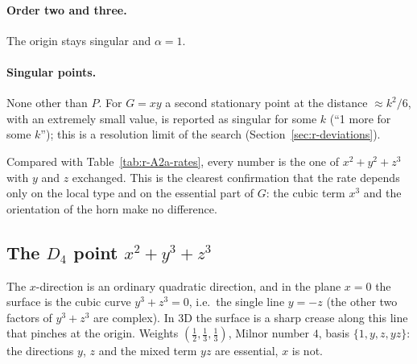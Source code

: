 \documentclass[12pt, a4paper]{article}
\theoremstyle{plain}
\theoremstyle{definition}
\theoremstyle{remark}
\theoremstyle{definition}
\begin{document}
\paragraph{Order two and three.} The origin stays singular and $\alpha=1$.

\paragraph{Singular points.} None other than $P$. For $G=xy$ a second stationary
point at the distance $\approx k^2/6$, with an extremely small value, is reported as
singular for some $k$ (``1 more for some $k$''); this is a resolution limit of the
search (Section~\ref{sec:r-deviations}).

Compared with Table~\ref{tab:r-A2a-rates}, every number is the one of
$x^2+y^2+z^3$ with $y$ and $z$ exchanged. This is the clearest confirmation that the
rate depends only on the local type and on the essential part of $G$: the cubic term
$x^3$ and the orientation of the horn make no difference.
\clearpage

\subsection{The $D_4$ point $x^2+y^3+z^3$}
\label{sec:r-D4a}

The $x$-direction is an ordinary quadratic direction, and in the plane $x=0$
the surface is the cubic curve $y^3+z^3=0$, i.e.\ the single line $y=-z$
(the other two factors of $y^3+z^3$ are complex). In 3D the surface is a sharp
crease along this line that pinches at the origin. Weights
$(\tfrac12,\tfrac13,\tfrac13)$, Milnor number $4$, basis $\{1,y,z,yz\}$: the
directions $y$, $z$ and the mixed term $yz$ are essential, $x$ is not.
\end{document}
